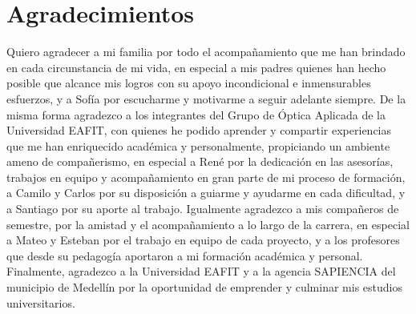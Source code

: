 \newcommand \agradecimientos{
\chapter*{\centering Agradecimientos}
\hspace{2em}Quiero agradecer a mi familia por todo el acompañamiento que me han brindado en cada circunstancia de mi vida, en especial a mis padres quienes han hecho posible que alcance mis logros con su apoyo incondicional e inmensurables esfuerzos, y a Sofía por escucharme y motivarme a seguir adelante siempre. De la misma forma agradezco a los integrantes del Grupo de Óptica Aplicada de la Universidad EAFIT, con quienes he podido aprender y compartir experiencias que me han enriquecido académica y personalmente, propiciando un ambiente ameno de compañerismo, en especial a René por la dedicación en las asesorías, trabajos en equipo y acompañamiento en gran parte de mi proceso de formación, a Camilo y Carlos por su disposición a guiarme y ayudarme en cada dificultad, y a Santiago por su aporte al trabajo. Igualmente agradezco a mis compañeros de semestre, por la amistad y el acompañamiento a lo largo de la carrera, en especial a Mateo y Esteban por el trabajo en equipo de cada proyecto, y a los profesores que desde su pedagogía aportaron a mi formación académica y personal. Finalmente, agradezco a la Universidad EAFIT y a la agencia SAPIENCIA del municipio de Medellín por la oportunidad de emprender y culminar mis estudios universitarios.
}

\portada 
\thispagestyle{empty}

\newpage\null\thispagestyle{empty}\newpage

\contraportada
\thispagestyle{empty}
\newpage\null\thispagestyle{empty}\newpage

\aceptacion
\newpage
\newpage\null\thispagestyle{empty}\newpage

\dedicatoria
\newpage\null\thispagestyle{empty}\newpage

\newpage
\agradecimientos
\newpage
\newpage\null\thispagestyle{empty}\newpage

